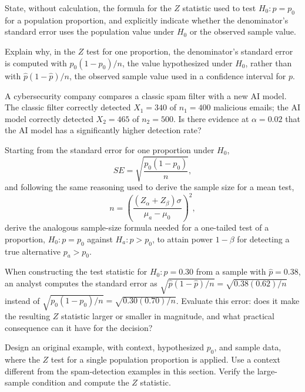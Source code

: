 \begin{problema}\label{prob:9667d45}
State, without calculation, the formula for the $Z$ statistic used to test $H_0:p=p_0$ for a population proportion, and explicitly indicate whether the denominator's standard error uses the population value under $H_0$ or the observed sample value.
\end{problema}

\begin{problema}\label{prob:fa8ecc5}
Explain why, in the $Z$ test for one proportion, the denominator's standard error is computed with $p_0(1-p_0)/n$, the value hypothesized under $H_0$, rather than with $\hat p(1-\hat p)/n$, the observed sample value used in a confidence interval for $p$.
\end{problema}

\begin{problema}\label{prob:7649a34}
A cybersecurity company compares a classic spam filter with a new AI model. The classic filter correctly detected $X_1=340$ of $n_1=400$ malicious emails; the AI model correctly detected $X_2=465$ of $n_2=500$. Is there evidence at $\alpha=0.02$ that the AI model has a significantly higher detection rate?
\end{problema}

\begin{problema}\label{prob:451f58f}
Starting from the standard error for one proportion under $H_0$,
\[
	SE=\sqrt{\frac{p_0(1-p_0)}{n}},
\]
and following the same reasoning used to derive the sample size for a mean test,
\[
	n=\left(\frac{(Z_\alpha+Z_\beta)\sigma}{\mu_a-\mu_0}\right)^2,
\]
derive the analogous sample-size formula needed for a one-tailed test of a proportion, $H_0:p=p_0$ against $H_a:p>p_0$, to attain power $1-\beta$ for detecting a true alternative $p_a>p_0$.
\end{problema}

\begin{problema}\label{prob:f016371}
When constructing the test statistic for $H_0:p=0.30$ from a sample with $\hat p=0.38$, an analyst computes the standard error as $\sqrt{\hat p(1-\hat p)/n}=\sqrt{0.38(0.62)/n}$ instead of $\sqrt{p_0(1-p_0)/n}=\sqrt{0.30(0.70)/n}$. Evaluate this error: does it make the resulting $Z$ statistic larger or smaller in magnitude, and what practical consequence can it have for the decision?
\end{problema}

\begin{problema}\label{prob:134cb53}
Design an original example, with context, hypothesized $p_0$, and sample data, where the $Z$ test for a single population proportion is applied. Use a context different from the spam-detection examples in this section. Verify the large-sample condition and compute the $Z$ statistic.
\end{problema}

